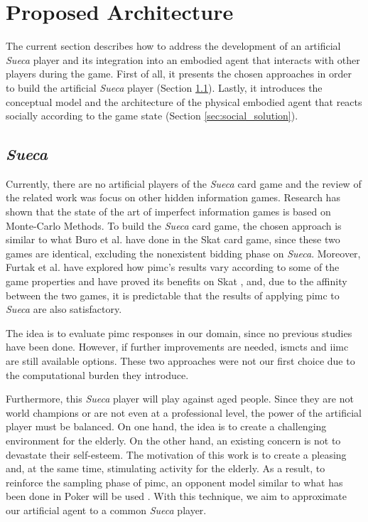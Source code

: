 \section{Proposed Architecture} \label{sec:architecture}

The current section describes how to address the development of an artificial \emph{Sueca} player and its integration into an embodied agent that interacts with other players during the game.
First of all, it presents the chosen approaches in order to build the artificial \emph{Sueca} player (Section \ref{sec:sueca_solution}).
Lastly, it introduces the conceptual model and the architecture of the physical embodied agent that reacts socially according to the game state (Section \ref{sec:social_solution}).


\subsection{\emph{Sueca}}
\label{sec:sueca_solution}

Currently, there are no artificial players of the \emph{Sueca} card game and the review of the related work was focus on other hidden information games.
Research has shown that the state of the art of imperfect information games is based on Monte-Carlo Methods.
To build the \emph{Sueca} card game, the chosen approach is similar to what Buro et al. have done in the Skat card game, since these two games are identical, excluding the nonexistent bidding phase on \emph{Sueca}.
Moreover, Furtak et al. have explored how \gls{pimc}'s results vary according to some of the game properties and have proved its benefits on Skat \cite{Long2010}, and, due to the affinity between the two games, it is predictable that the results of applying \gls{pimc} to \emph{Sueca} are also satisfactory.


The idea is to evaluate \gls{pimc} responses in our domain, since no previous studies have been done.
However, if further improvements are needed, \gls{ismcts} and \gls{iimc} are still available options.
These two approaches were not our first choice due to the computational burden they introduce.


Furthermore, this \emph{Sueca} player will play against aged people.
Since they are not world champions or are not even at a professional level, the power of the artificial player must be balanced.
On one hand, the idea is to create a challenging environment for the elderly.
On the other hand, an existing concern is not to devastate their self-esteem.
The motivation of this work is to create a pleasing and, at the same time, stimulating activity for the elderly.
As a result, to reinforce the sampling phase of \gls{pimc}, an opponent model similar to what has been done in Poker will be used \cite{Ponsen2008}.
With this technique, we aim to approximate our artificial agent to a common \emph{Sueca} player.


